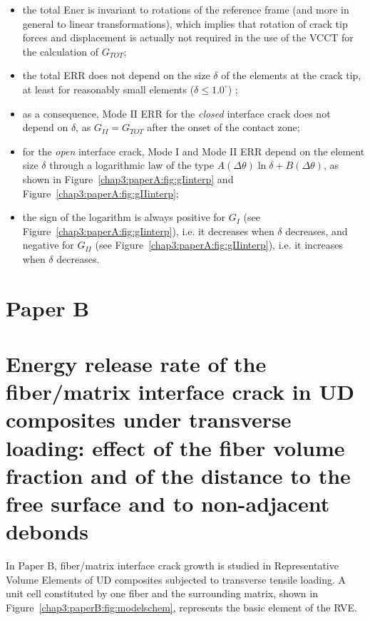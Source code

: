 \begin{itemize}
\item the total Ener is invariant to rotations of the reference frame (and more in general to linear transformations), which implies that rotation of crack tip forces and displacement is actually not required in the use of the VCCT for the calculation of $G_{TOT}$;
\item the total ERR does not depend on the size $\delta$ of the elements at the crack tip, at least for reasonably small elements ($\delta\leq1.0^{\circ}$) ;
\item as a consequence, Mode II ERR for the \emph{closed} interface crack does not depend on $\delta$, as $G_{II}=G_{TOT}$ after the onset of the contact zone;
\item for the \emph{open} interface crack, Mode I and Mode II ERR depend on the element size $\delta$ through a logarithmic law of the type $A\left(\Delta\theta\right)\ln\delta+B\left(\Delta\theta\right)$, as shown in Figure~\ref{chap3:paperA:fig:gIinterp} and Figure~\ref{chap3:paperA:fig:gIIinterp};
\item the sign of the logarithm is always positive for $G_{I}$ (see Figure~\ref{chap3:paperA:fig:gIinterp}), i.e. it decreases when $\delta$ decreases, and negative for $G_{II}$ (see Figure~\ref{chap3:paperA:fig:gIIinterp}), i.e. it increases when $\delta$ decreases.
\end{itemize}


\section{Paper B}
\section*{Energy release rate of the fiber/matrix interface crack in UD composites under transverse loading: effect of the fiber volume fraction and of the distance to the free surface and to non-adjacent debonds}

In Paper B, fiber/matrix interface crack growth is studied in Representative Volume Elements of UD composites subjected to transverse tensile loading. A unit cell constituted by one fiber and the surrounding matrix, shown in Figure~\ref{chap3:paperB:fig:modelschem}, represents the basic element of the RVE.

